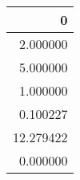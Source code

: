 \begin{tabular}{r}
\toprule
0 \\
\midrule
2.000000 \\
5.000000 \\
1.000000 \\
0.100227 \\
12.279422 \\
0.000000 \\
\bottomrule
\end{tabular}
